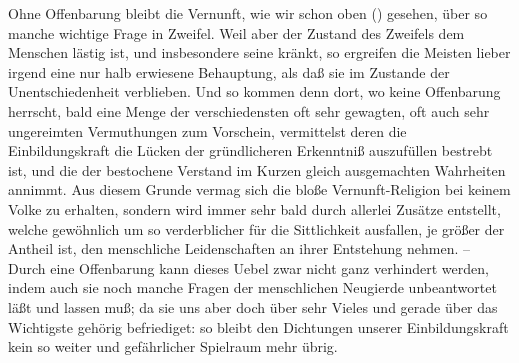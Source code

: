 \begin{aufza}
\item  Ohne Offenbarung bleibt die Vernunft, wie wir schon oben () gesehen, über so manche wichtige Frage in Zweifel. Weil aber der Zustand des Zweifels dem Menschen lästig ist, und insbesondere seine  kränkt, so ergreifen die Meisten lieber irgend eine nur halb erwiesene Behauptung, als daß sie im Zustande der Unentschiedenheit verblieben. Und so kommen denn dort, wo keine Offenbarung herrscht, bald eine Menge der verschiedensten oft sehr gewagten, oft auch sehr ungereimten Vermuthungen zum Vorschein, vermittelst deren die Einbildungskraft die Lücken der gründlicheren Erkenntniß auszufüllen bestrebt ist, und die der bestochene Verstand im Kurzen gleich ausgemachten Wahrheiten annimmt. Aus diesem Grunde vermag sich die bloße Vernunft-Religion bei keinem Volke  zu erhalten, sondern wird immer sehr bald durch allerlei Zusätze entstellt, welche gewöhnlich um so verderblicher für die Sittlichkeit ausfallen, je größer der Antheil ist, den menschliche Leidenschaften an ihrer Entstehung nehmen. -- Durch eine Offenbarung kann dieses Uebel zwar nicht ganz verhindert werden, indem auch sie noch manche Fragen der menschlichen Neugierde unbeantwortet läßt und lassen muß; da sie uns aber doch über sehr Vieles und gerade über das Wichtigste gehörig befriediget: so bleibt den Dichtungen unserer Einbildungskraft kein so weiter und gefährlicher Spielraum mehr übrig.
\end{aufza}\par
   
